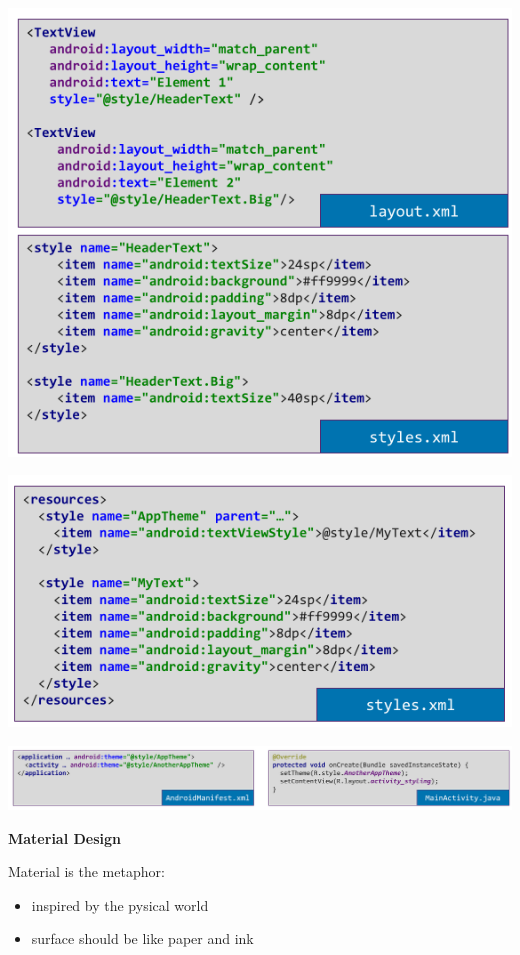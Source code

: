 \documentclass[11pt,twoside,landscape]{article}
\begin{document}
\begin{multicols}{3}
\begin{center}
\includegraphics[width=.9\linewidth]{img/styling_in_the_android_sdk.png}
\end{center}

\begin{center}
\includegraphics[width=.9\linewidth]{img/theme_definition.png}
\end{center}

\begin{center}
\includegraphics[width=.9\linewidth]{img/use_themes_in_android.png}
\end{center}


\textbf{Material Design}

Material is the metaphor:
\begin{itemize}
\item inspired by the pysical world
\item surface should be like paper and ink
\end{itemize}


\end{multicols}
\end{document}
